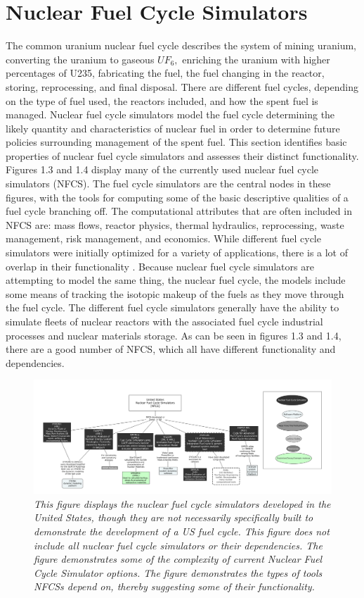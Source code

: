 \documentclass[12pt]{UIdahoMastersThesis}
\begin{document}
\section{Nuclear Fuel Cycle Simulators}
The common uranium nuclear fuel cycle describes the system of mining uranium, converting the uranium to gaseous $UF_6,$ enriching the uranium with higher percentages of U235, fabricating the fuel, the fuel changing in the reactor, storing, reprocessing, and final disposal. There are different fuel cycles, depending on the type of fuel used, the reactors included, and how the spent fuel is managed. Nuclear fuel cycle simulators model the fuel cycle determining the likely quantity and characteristics of nuclear fuel in order to determine future policies surrounding management of the spent fuel.
This section identifies basic properties of nuclear fuel cycle simulators and assesses their distinct functionality. Figures 1.3 and 1.4 display many of the currently used nuclear fuel cycle simulators (NFCS). The fuel cycle simulators are the central nodes in these figures, with the tools for computing some of the basic descriptive qualities of a fuel cycle branching off. The computational attributes that are often included in NFCS are: mass flows, reactor physics, thermal hydraulics, reprocessing, waste management, risk management, and economics. While different fuel cycle simulators were initially optimized for a variety of applications, there is a lot of overlap in their functionality \cite {Guerin2009}. Because nuclear fuel cycle simulators are attempting to model the same thing, the nuclear fuel cycle, the models include some means of tracking the isotopic makeup of the fuels as they move through the fuel cycle. The different fuel cycle simulators generally have the ability to simulate fleets of nuclear reactors with the associated fuel cycle industrial processes and nuclear materials storage. As can be seen in figures 1.3 and 1.4, there are a good number of NFCS, which all have different functionality and dependencies.
\begin{figure}
\includegraphics[width=\textwidth]{US_FUEL_TOOLS.png}
\caption{\small \sl This figure displays the nuclear fuel cycle simulators developed in the United States, though they are not necessarily specifically built to demonstrate the development of a US fuel cycle. This figure does not include all nuclear fuel cycle simulators or their dependencies.  The figure demonstrates some of the complexity of current Nuclear Fuel Cycle Simulator options. The figure demonstrates the types of tools NFCSs depend on, thereby suggesting some of their functionality.}
\end{figure}
\end{document}
